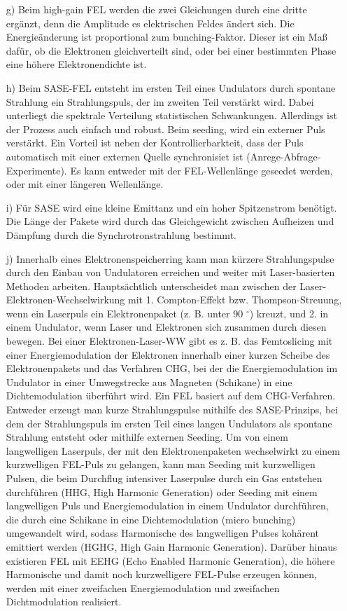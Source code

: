 \documentclass[11pt,a4paper]{article}
\begin{document}
\begin{itemize}
		\item[g)]
			Beim high-gain FEL werden die zwei Gleichungen durch eine dritte ergänzt,
			denn die Amplitude es elektrischen Feldes ändert sich.
			Die Energieänderung ist proportional zum bunching-Faktor.
			Dieser ist ein Maß dafür, ob die Elektronen gleichverteilt sind,
			oder bei einer bestimmten Phase eine höhere Elektronendichte ist.
		
		\item[h)]
			Beim SASE-FEL entsteht im ersten Teil eines Undulators durch spontane Strahlung ein Strahlungspuls,
			der im zweiten Teil verstärkt wird. 
			Dabei unterliegt die spektrale Verteilung statistischen Schwankungen.
			Allerdings ist der Prozess auch einfach und robust.
			Beim seeding, wird ein externer Puls verstärkt.
			Ein Vorteil ist neben der Kontrollierbarkteit, 
			dass der Puls automatisch mit einer externen Quelle synchronisiet ist (Anrege-Abfrage-Experimente).
			Es kann entweder mit der FEL-Wellenlänge geseedet werden, oder mit einer längeren Wellenlänge.
		
		\item[i)]
			Für SASE wird eine kleine Emittanz und ein hoher Spitzenstrom benötigt.
			Die Länge der Pakete wird durch das Gleichgewicht zwischen Aufheizen und Dämpfung durch die Synchrotronstrahlung bestimmt.
		
		\item[j)]
			Innerhalb eines Elektronenspeicherring kann man kürzere Strahlungspulse durch den Einbau von Undulatoren erreichen und weiter mit Laser-basierten 
			Methoden arbeiten. Hauptsächtlich unterscheidet man zwischen der Laser-Elektronen-Wechselwirkung mit 1. Compton-Effekt bzw. Thompson-Streuung, wenn ein 
			Laserpuls ein Elektronenpaket (z. B. unter 90 $^\circ$) kreuzt, und 2. in einem Undulator, wenn Laser und Elektronen sich zusammen durch diesen bewegen.
			Bei einer Elektronen-Laser-WW gibt es z. B. das Femtoslicing mit einer Energiemodulation der Elektronen innerhalb einer kurzen Scheibe des Elektronenpakets
			und das Verfahren CHG, bei der die Energiemodulation im Undulator in einer Umwegstrecke aus Magneten (Schikane) in eine Dichtemodulation überführt wird.
			Ein FEL basiert auf dem CHG-Verfahren. Entweder erzeugt man kurze Strahlungspulse mithilfe des SASE-Prinzips, bei dem der Strahlungspuls
			im ersten Teil eines langen Undulators als spontane Strahlung entsteht oder mithilfe externen Seeding. Um von einem langwelligen Laserpuls, der mit den Elektronenpaketen
			wechselwirkt zu einem kurzwelligen FEL-Puls zu gelangen, kann man Seeding mit kurzwelligen Pulsen, die beim Durchflug intensiver Laserpulse durch ein Gas
			entstehen durchführen (HHG, High Harmonic Generation) oder Seeding mit einem langwelligen Puls und Energiemodulation in einem Undulator durchführen, die durch
			eine Schikane in eine Dichtemodulation (micro bunching) umgewandelt wird, sodass Harmonische des langwelligen Pulses kohärent emittiert werden (HGHG, High Gain Harmonic Generation).
			Darüber hinaus existieren FEL mit EEHG (Echo Enabled Harmonic Generation), die höhere Harmonische und damit noch kurzwelligere FEL-Pulse erzeugen können, 
			werden mit einer zweifachen Energiemodulation und zweifachen Dichtmodulation realisiert.
		

\end{itemize}
\end{document}
